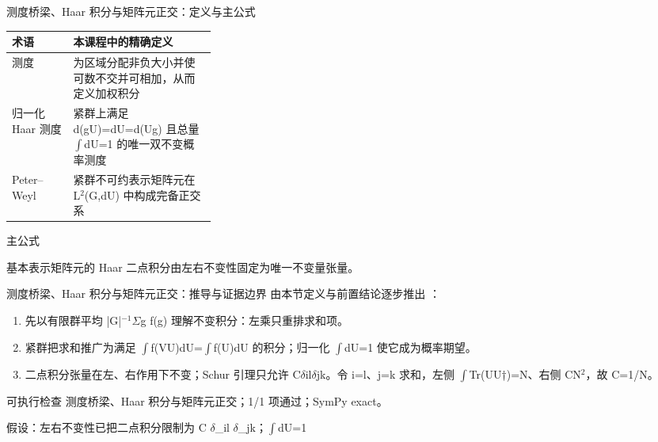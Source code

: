 \begin{frame}[t]{测度桥梁、Haar 积分与矩阵元正交：定义与主公式}
\footnotesize\begin{tabularx}{\linewidth}{p{0.30\linewidth}Y}
\toprule 术语 & 本课程中的精确定义\\\midrule
{} 测度 & 为区域分配非负大小并使可数不交并可相加，从而定义加权积分\\
 归一化 Haar 测度 & 紧群上满足 d(gU)=dU=d(Ug) 且总量 \ensuremath{\int}dU=1 的唯一双不变概率测度\\
 Peter--Weyl & 紧群不可约表示矩阵元在 L\ensuremath{^{2}}(G,dU) 中构成完备正交系\\
\bottomrule\end{tabularx}\vspace{0.15cm}
\begin{block}{ 主公式}\centering{}\end{block}
基本表示矩阵元的 Haar 二点积分由左右不变性固定为唯一不变量张量。
\end{frame}

\begin{frame}[t]{测度桥梁、Haar 积分与矩阵元正交：推导与证据边界}
\footnotesize
{}\quad 由本节定义与前置结论逐步推出 ：
\begin{enumerate}
\item 先以有限群平均 |G|\ensuremath{^{-1}}\ensuremath{\Sigma}g f(g) 理解不变积分：左乘只重排求和项。
\item 紧群把求和推广为满足 \ensuremath{\int}f(VU)dU=\ensuremath{\int}f(U)dU 的积分；归一化 \ensuremath{\int}dU=1 使它成为概率期望。
\item 二点积分张量在左、右作用下不变；Schur 引理只允许 C\ensuremath{\delta}il\ensuremath{\delta}jk。令 i=l、j=k 求和，左侧 \ensuremath{\int}Tr(UU†)=N、右侧 CN\ensuremath{^{2}}，故 C=1/\allowbreak{}N。
\end{enumerate}\begin{block}{可执行检查}
\quad 测度桥梁、Haar 积分与矩阵元正交；1/1 项通过；SymPy exact。
\par\scriptsize 假设：左右不变性已把二点积分限制为 C \ensuremath{\delta}\_il \ensuremath{\delta}\_jk；\ensuremath{\int}dU=1
\end{block}
\end{frame}

